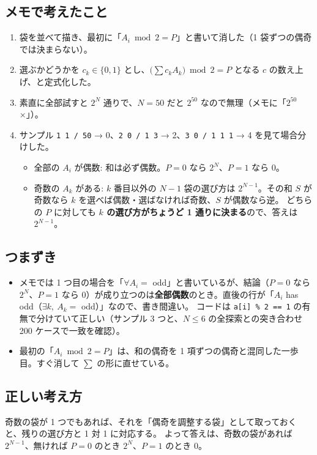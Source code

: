 \documentclass[a4paper]{article}
\begin{document}
\subsection*{メモで考えたこと}
\begin{enumerate}
  \item 袋を並べて描き、最初に「$A_i \bmod 2 = P$」と書いて消した（1 袋ずつの偶奇では決まらない）。
  \item 選ぶかどうかを $c_k \in \lbrace 0,1 \rbrace$ とし、$\bigl(\sum c_k A_k\bigr) \bmod 2 = P$ となる $c$ の数え上げ、と定式化した。
  \item 素直に全部試すと $2^N$ 通りで、$N = 50$ だと $2^{50}$ なので無理（メモに「$2^{50}$ ×」）。
  \item サンプル \verb|1 1 / 50| → 0、\verb|2 0 / 1 3| → 2、\verb|3 0 / 1 1 1| → 4 を見て場合分けした。
    \begin{itemize}
      \item 全部の $A_i$ が偶数: 和は必ず偶数。$P = 0$ なら $2^N$、$P = 1$ なら $0$。
      \item 奇数の $A_k$ がある: $k$ 番目以外の $N-1$ 袋の選び方は $2^{N-1}$。その和 $S$ が奇数なら $k$ を選べば偶数・選ばなければ奇数、$S$ が偶数なら逆。
        どちらの $P$ に対しても \textbf{$k$ の選び方がちょうど 1 通りに決まる}ので、答えは $2^{N-1}$。
    \end{itemize}
\end{enumerate}

\subsection*{つまずき}
\begin{itemize}
  \item メモでは 1 つ目の場合を「$\forall A_i = $ odd」と書いているが、結論（$P=0$ なら $2^N$、$P=1$ なら $0$）が成り立つのは\textbf{全部偶数}のとき。直後の行が「$A_i$ has odd（$\exists k,\ A_k = $ odd）」なので、書き間違い。
    コードは \verb|a[i] % 2 == 1| の有無で分けていて正しい（サンプル 3 つと、$N \leq 6$ の全探索との突き合わせ 200 ケースで一致を確認）。
  \item 最初の「$A_i \bmod 2 = P$」は、和の偶奇を 1 項ずつの偶奇と混同した一歩目。すぐ消して $\sum$ の形に直せている。
\end{itemize}

\subsection*{正しい考え方}
奇数の袋が 1 つでもあれば、それを「偶奇を調整する袋」として取っておくと、残りの選び方と 1 対 1 に対応する。
よって答えは、奇数の袋があれば $2^{N-1}$、無ければ $P = 0$ のとき $2^N$、$P = 1$ のとき $0$。
\end{document}
